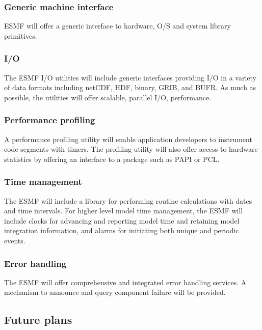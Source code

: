 \subsubsection{Generic machine interface}

ESMF will offer a generic interface to hardware, O/S and system
library primitives.

\subsubsection{I/O}

The ESMF I/O utilities will include generic interfaces providing I/O
in a variety of data formats including netCDF, HDF, binary, GRIB, and
BUFR. As much as possible, the utilities will offer scalable, parallel I/O,
performance.

\subsubsection{Performance profiling}

A performance profiling utility will enable application developers to 
instrument code segments with timers. The profiling utility will also
offer access to hardware statistics by offering an interface to a
package such as PAPI or PCL.

\subsubsection{Time management}

The ESMF will include a library for performing routine 
calculations with dates and time intervals.  For higher level model
time management, the ESMF will include clocks for advancing and 
reporting model time and retaining model integration information, 
and alarms for initiating both unique and periodic events.

\subsubsection{Error handling}

The ESMF will offer comprehensive and integrated error handling
services.  A mechanism to announce and query component failure will be
provided.

\subsection{Future plans}

